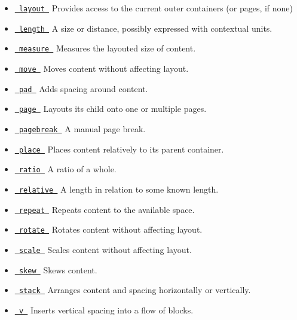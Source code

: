 \begin{itemize}
\item
  \href{/docs/reference/layout/layout/}{\texttt{\ layout\ }} { Provides
  access to the current outer container\textquotesingle s (or
  page\textquotesingle s, if none) }
\item
  \href{/docs/reference/layout/length/}{\texttt{\ length\ }} { A size or
  distance, possibly expressed with contextual units. }
\item
  \href{/docs/reference/layout/measure/}{\texttt{\ measure\ }} {
  Measures the layouted size of content. }
\item
  \href{/docs/reference/layout/move/}{\texttt{\ move\ }} { Moves content
  without affecting layout. }
\item
  \href{/docs/reference/layout/pad/}{\texttt{\ pad\ }} { Adds spacing
  around content. }
\item
  \href{/docs/reference/layout/page/}{\texttt{\ page\ }} { Layouts its
  child onto one or multiple pages. }
\item
  \href{/docs/reference/layout/pagebreak/}{\texttt{\ pagebreak\ }} { A
  manual page break. }
\item
  \href{/docs/reference/layout/place/}{\texttt{\ place\ }} { Places
  content relatively to its parent container. }
\item
  \href{/docs/reference/layout/ratio/}{\texttt{\ ratio\ }} { A ratio of
  a whole. }
\item
  \href{/docs/reference/layout/relative/}{\texttt{\ relative\ }} { A
  length in relation to some known length. }
\item
  \href{/docs/reference/layout/repeat/}{\texttt{\ repeat\ }} { Repeats
  content to the available space. }
\item
  \href{/docs/reference/layout/rotate/}{\texttt{\ rotate\ }} { Rotates
  content without affecting layout. }
\item
  \href{/docs/reference/layout/scale/}{\texttt{\ scale\ }} { Scales
  content without affecting layout. }
\item
  \href{/docs/reference/layout/skew/}{\texttt{\ skew\ }} { Skews
  content. }
\item
  \href{/docs/reference/layout/stack/}{\texttt{\ stack\ }} { Arranges
  content and spacing horizontally or vertically. }
\item
  \href{/docs/reference/layout/v/}{\texttt{\ v\ }} { Inserts vertical
  spacing into a flow of blocks. }
\end{itemize}

\href{/docs/reference/symbols/symbol/}{\pandocbounded{}}

